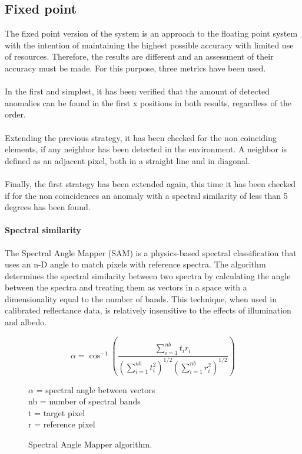 \subsection{Fixed point}
The fixed point version of the system is an approach to the floating point system with the intention of maintaining the highest possible accuracy with limited use of resources.
Therefore, the results are different and an assessment of their accuracy must be made. For this purpose, three metrics have been used.
\\
\\
In the first and simplest, it has been verified that the amount of detected anomalies can be found in the first x positions in both results, regardless of the order.
\\
\\
Extending the previous strategy, it has been checked for the non coinciding elements, if any neighbor has been detected in the environment. A neighbor is defined as an adjacent pixel, both in a straight line and in diagonal.
\\
\\
Finally, the first strategy has been extended again, this time it has been checked if for the non coincidences an anomaly with a spectral similarity of less than 5 degrees has been found.
\\
\paragraph{Spectral similarity}
The Spectral Angle Mapper (SAM) is a physics-based spectral classification that uses an n-D angle to match pixels with reference spectra. The algorithm determines the spectral similarity between two spectra by calculating the angle between the spectra and treating them as vectors in a space with a dimensionality equal to the number of bands. This technique, when used in calibrated reflectance data, is relatively insensitive to the effects of illumination and albedo.
\begin{figure}[h!]
\begin{minipage}[t]{0.5\linewidth}
\centering
\[\alpha = \cos^{-1}\left ( \frac{\sum\limits^{nb}_{i=1}{t_{i}r_{i}}}{\left ( \sum\limits^{nb}_{i=1}{t_{i}^2} \right )^{1/2}\left ( \sum\limits^{nb}_{i=1}{r_{i}^2} \right )^{1/2}} \right )\]
\label{sam}
\end{minipage}
\begin{minipage}[t]{0.05\linewidth}
\end{minipage}
\begin{minipage}[t]{0.45\linewidth}
\vspace{0.7cm}
$\alpha$ = spectral angle between vectors
\\
nb = number of spectral bands
\\
t = target pixel
\\
r = reference pixel
\end{minipage}
\caption{Spectral Angle Mapper algorithm.}
\end{figure}

